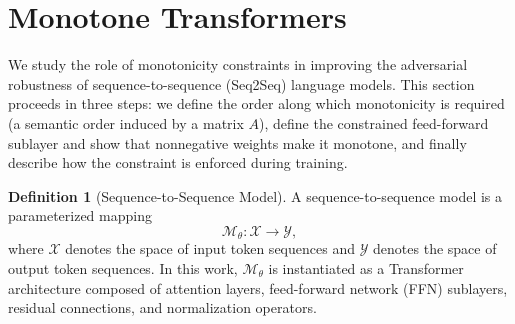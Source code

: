 \documentclass{article}
\theoremstyle{plain}
\theoremstyle{definition}
\newtheorem{definition}[theorem]{Definition}
\theoremstyle{remark}
\begin{document}
\section{Monotone Transformers}
\label{Prelim}
We study the role of monotonicity constraints in improving the adversarial robustness of sequence-to-sequence (Seq2Seq) language models.
This section proceeds in three steps: we define the order along which monotonicity is required (a semantic order induced by a matrix $A$), define the constrained feed-forward sublayer and show that nonnegative weights make it monotone, and finally describe how the constraint is enforced during training.
\begin{definition}[Sequence-to-Sequence Model]
A sequence-to-sequence model is a parameterized mapping
\[
\mathcal{M}_\theta : \mathcal{X} \to \mathcal{Y},
\]
where $\mathcal{X}$ denotes the space of input token sequences and $\mathcal{Y}$ denotes the space of output token sequences. In this work, $\mathcal{M}_\theta$ is instantiated as a Transformer architecture composed of attention layers, feed-forward network (FFN) sublayers, residual connections, and normalization operators.
\end{definition}

\end{document}
